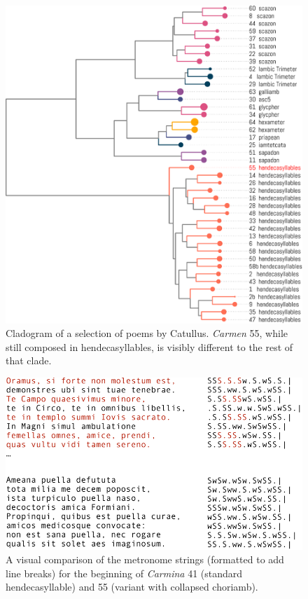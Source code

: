 \documentclass[
    hf
]{ceurart}
\begin{document}
\begin{figure}
    \includegraphics[width=\linewidth]{figures/catullus_dendro-crop.pdf}
    \caption{Cladogram of a selection of poems by Catullus. \emph{Carmen} 55, while still composed in hendecasyllables, is visibly different to the rest of that clade.}
    \label{fig:cat_phylo}
\end{figure}

\begin{figure}
    \centering
    \includegraphics[width=0.8\linewidth]{figures/55v41-crop.pdf}
    \caption{A visual comparison of the metronome strings (formatted to add line breaks) for the beginning of \emph{Carmina} 41 (standard hendecasyllable) and 55 (variant with collapsed choriamb).}
    \label{fig:55_41}
\end{figure}
\end{document}
